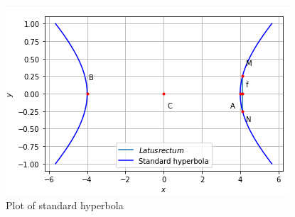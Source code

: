 \begin{figure}[ht]
\centering
\includegraphics[width=\columnwidth]{solutions/su2021/2/38/b/hyperbola.PNG}
\caption{Plot of standard hyperbola}
\label{quadform/2/38/b/Plot of standard hyperbola}
\end{figure}

